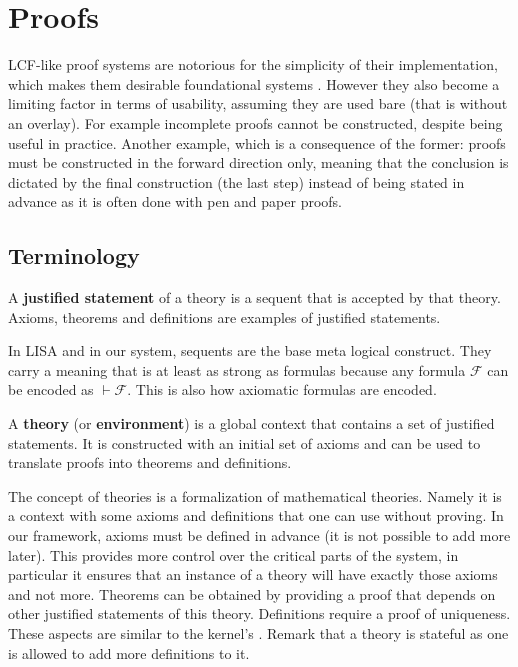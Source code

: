 \section{Proofs}
\label{sec:proofs}

LCF-like proof systems are notorious for the simplicity of their implementation, which makes them desirable foundational systems \cite{Paulson2019}. However they also become a limiting factor in terms of usability, assuming they are used bare (that is without an overlay). For example incomplete proofs cannot be constructed, despite being useful in practice. Another example, which is a consequence of the former: proofs must be constructed in the forward direction only, meaning that the conclusion is dictated by the final construction (the last step) instead of being stated in advance as it is often done with pen and paper proofs.

\subsection{Terminology}

\begin{definition}
A \textbf{justified statement} of a theory is a sequent that is accepted by that theory. Axioms, theorems and definitions are examples of justified statements.
\end{definition}

In LISA and in our system, sequents are the base meta logical construct. They carry a meaning that is at least as strong as formulas because any formula $\mathcal{F}$ can be encoded as $\vdash \mathcal{F}$. This is also how axiomatic formulas are encoded.

\begin{definition}[Theory]
A \textbf{theory} (or \textbf{environment}) is a global context that contains a set of justified statements. It is constructed with an initial set of axioms and can be used to translate proofs into theorems and definitions.
\end{definition}

The concept of theories is a formalization of mathematical theories. Namely it is a context with some axioms and definitions that one can use without proving. In our framework, axioms must be defined in advance (it is not possible to add more later). This provides more control over the critical parts of the system, in particular it ensures that an instance of a theory will have exactly those axioms and not more. Theorems can be obtained by providing a proof that depends on other justified statements of this theory. Definitions require a proof of uniqueness. These aspects are similar to the kernel's . Remark that a theory is stateful as one is allowed to add more definitions to it.

